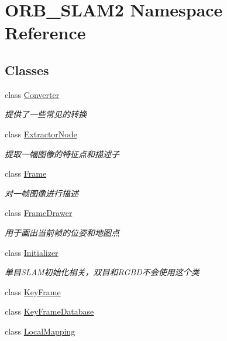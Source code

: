 \hypertarget{namespace_o_r_b___s_l_a_m2}{}\section{O\+R\+B\+\_\+\+S\+L\+A\+M2 Namespace Reference}
\label{namespace_o_r_b___s_l_a_m2}
\subsection*{Classes}
\begin{DoxyCompactItemize}
\item 
class \mbox{\hyperlink{class_o_r_b___s_l_a_m2_1_1_converter}{Converter}}
\begin{DoxyCompactList}\small\item\em 提供了一些常见的转换 \end{DoxyCompactList}\item 
class \mbox{\hyperlink{class_o_r_b___s_l_a_m2_1_1_extractor_node}{Extractor\+Node}}
\begin{DoxyCompactList}\small\item\em 提取一幅图像的特征点和描述子 \end{DoxyCompactList}\item 
class \mbox{\hyperlink{class_o_r_b___s_l_a_m2_1_1_frame}{Frame}}
\begin{DoxyCompactList}\small\item\em 对一帧图像进行描述 \end{DoxyCompactList}\item 
class \mbox{\hyperlink{class_o_r_b___s_l_a_m2_1_1_frame_drawer}{Frame\+Drawer}}
\begin{DoxyCompactList}\small\item\em 用于画出当前帧的位姿和地图点 \end{DoxyCompactList}\item 
class \mbox{\hyperlink{class_o_r_b___s_l_a_m2_1_1_initializer}{Initializer}}
\begin{DoxyCompactList}\small\item\em 单目\+S\+L\+A\+M初始化相关，双目和\+R\+G\+B\+D不会使用这个类 \end{DoxyCompactList}\item 
class \mbox{\hyperlink{class_o_r_b___s_l_a_m2_1_1_key_frame}{Key\+Frame}}
\item 
class \mbox{\hyperlink{class_o_r_b___s_l_a_m2_1_1_key_frame_database}{Key\+Frame\+Database}}
\item 
class \mbox{\hyperlink{class_o_r_b___s_l_a_m2_1_1_local_mapping}{Local\+Mapping}}

\end{DoxyCompactItemize}
